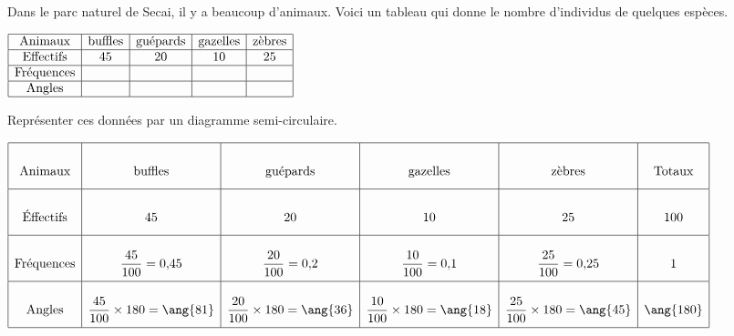 \begin{corrige}
    Dans le parc naturel de Secai, il y a beaucoup d'animaux.
    Voici un tableau qui donne le nombre d'individus de quelques espèces.
    
    \smallskip
    $\begin{array}{|c|c|c|c|c|}
    \hline
    \text{Animaux} & \text{buffles} & \text{guépards} & \text{gazelles} & \text{zèbres}\\
    \hline
    \text{Effectifs} & 45 & 20 & 10 & 25\\
    \hline
    \text{Fréquences} &   &   &   &  \\
    \hline
    \text{Angles} &   &   &   &  \\
    \hline
    \end{array}$    
    
    \smallskip
    Représenter ces données par un diagramme semi-circulaire.
    
    \smallskip
   {\red
    $\renewcommand{\arraystretch}{3}
    \begin{array}{|c|c|c|c|c|c|}
    \hline
    \text{Animaux} & \text{buffles} & \text{guépards} & \text{gazelles} & \text{zèbres} & \text{Totaux}\\
    \hline
    \text{Éffectifs} & 45 & 20 & 10 & 25 & 100\\
    \hline
    \text{Fréquences} & \dfrac{45}{100}=0{,}45 & \dfrac{20}{100}=0{,}2 & \dfrac{10}{100}=0{,}1 & \dfrac{25}{100}=0{,}25 & 1\\
    \hline
    \text{Angles} & \dfrac{45}{100} \times 180 = \ang{81} & \dfrac{20}{100} \times 180 = \ang{36} & \dfrac{10}{100} \times 180 = \ang{18} & \dfrac{25}{100} \times 180 = \ang{45} & \ang{180}\\
    \hline
    \end{array}
    \renewcommand{\arraystretch}{1}$
    \medskip
    \begin{tikzpicture}[baseline,scale=0.5]
    

\end{tikzpicture}}
\end{corrige}
